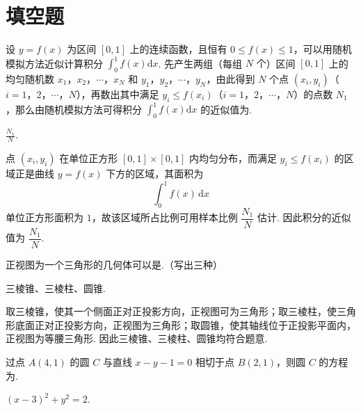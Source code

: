 \section{填空题}

\begin{problem}
设 \( y = f(x) \) 为区间 \([0,1]\) 上的连续函数，且恒有 \( 0 \leqslant f(x) \leqslant 1 \)，可以用随机模拟方法近似计算积分 \(\int_{0}^{1} f(x) \mathrm{d}x\). 先产生两组（每组 \(N\text{ 个}\)）区间 \([0,1]\) 上的均匀随机数 \(x_1\)，\(x_2\)，\(\cdots\)，\(x_N\) 和 \(y_1\)，\(y_2\)，\(\cdots\)，\(y_N\)，由此得到 \(N\text{ 个}\)点 \((x_i, y_i)\)（\(i = 1\)，\(2\)，\(\cdots\)，\(N\)），再数出其中满足 \( y_i \leqslant f(x_i) \)（\(i = 1\)，\(2\)，\(\cdots\)，\(N\)）的点数 \(N_1\)，那么由随机模拟方法可得积分 \( \int_0^1 f(x) \mathrm{d}x \) 的近似值为\fillinblank{}.
\end{problem}

\begin{answer}
\(\frac{N_{1}}{N}\).
\end{answer}

\begin{solution}
点 \((x_i,y_i)\) 在单位正方形 \([0,1]\times[0,1]\) 内均匀分布，而满足 \(y_i\leqslant f(x_i)\) 的区域正是曲线 \(y=f(x)\) 下方的区域，其面积为
\[
\int_0^1f(x)\,\mathrm{d}x
\]
单位正方形面积为 \(1\)，故该区域所占比例可用样本比例 \(\dfrac{N_1}{N}\) 估计. 因此积分的近似值为 \(\dfrac{N_1}{N}\).
\end{solution}

\begin{problem}
正视图为一个三角形的几何体可以是\fillinblank{}.（写出三种）
\end{problem}

\begin{answer}
三棱锥、三棱柱、圆锥.
\end{answer}

\begin{solution}
取三棱锥，使其一个侧面正对正投影方向，正视图可为三角形；取三棱柱，使三角形底面正对正投影方向，正视图为三角形；取圆锥，使其轴线位于正投影平面内，正视图为等腰三角形. 因此三棱锥、三棱柱、圆锥均符合题意.
\end{solution}

\begin{problem}
过点 \(A(4,1)\) 的圆 \(C\) 与直线 \(x - y - 1 = 0\) 相切于点 \(B(2,1)\)，则圆 \(C\) 的方程为\fillinblank{}.
\end{problem}

\begin{answer}
\((x-3)^2+y^2=2\).
\end{answer}

